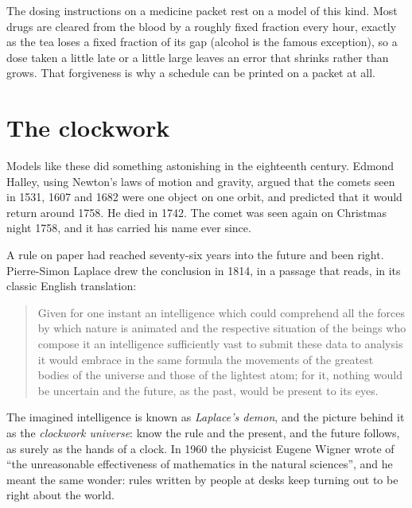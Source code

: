 \begin{worldbox}
The dosing instructions on a medicine packet rest on a model of this kind.
Most drugs are cleared from the blood by a roughly fixed fraction every hour,
exactly as the tea loses a fixed fraction of its gap (alcohol is the famous
exception), so a dose taken a little late or a little large leaves an error
that shrinks rather than grows. That forgiveness is why a schedule can be
printed on a packet at all.
\end{worldbox}

\section{The clockwork}
\label{sec:ch01-clockwork}

\noindent
Models like these did something astonishing in the eighteenth century.
Edmond Halley, using Newton's laws of motion and gravity, argued that the
comets seen in 1531, 1607 and 1682 were one object on one orbit, and
predicted that it would return around 1758. He died in 1742. The comet was
seen again on Christmas night 1758, and it has carried his name ever since.

A rule on paper had reached seventy-six years into the future and been
right. Pierre-Simon Laplace drew the conclusion in 1814, in a passage that
reads, in its classic English translation:

\begin{quote}
Given for one instant an intelligence which could comprehend all the forces
by which nature is animated and the respective situation of the beings who
compose it \dash{} an intelligence sufficiently vast to submit these data to
analysis \dash{} it would embrace in the same formula the movements of the
greatest bodies of the universe and those of the lightest atom; for it,
nothing would be uncertain and the future, as the past, would be present to
its eyes.
\end{quote}

\noindent
The imagined intelligence is known as \emph{Laplace's demon}, and the picture
behind it as the \emph{clockwork universe}: know the rule and the present,
and the future follows, as surely as the hands of a clock. In 1960 the
physicist Eugene Wigner wrote of \enquote{the unreasonable effectiveness of
mathematics in the natural sciences}, and he meant the same wonder: rules
written by people at desks keep turning out to be right about the world.

